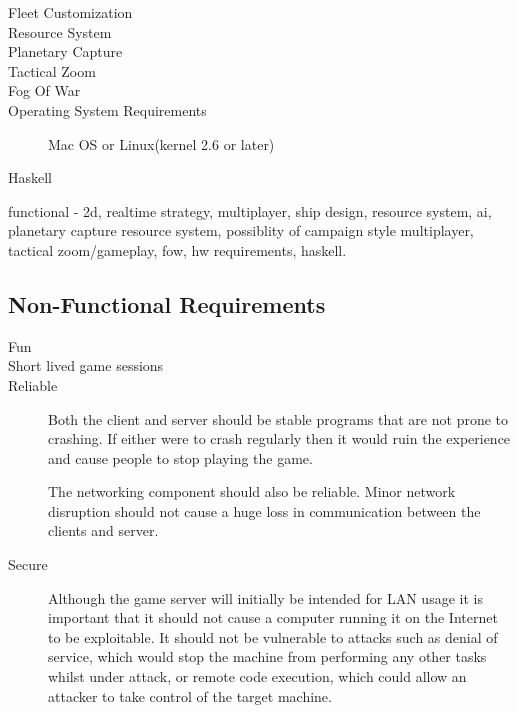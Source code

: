\begin{description}
\item[Fleet Customization]



\item[Resource System]

\item[Planetary Capture]

\item[Tactical Zoom]

\item[Fog Of War]

\item[Operating System Requirements]
Mac OS or Linux(kernel 2.6 or later) 

\item[Haskell]

\end{description}

functional - 2d, realtime strategy, multiplayer, ship design, resource system, ai, planetary capture resource system, possiblity of campaign style multiplayer, tactical zoom/gameplay, fow, hw requirements, haskell.


\subsection{Non-Functional Requirements}

\begin{description}

	\item[Fun]

	\item[Short lived game sessions]

	\item[Reliable]

		Both the client and server should be stable programs that are not prone to
		crashing. If either were to crash regularly then it would ruin the experience
		and cause people to stop playing the game.

		The networking component should also be reliable. Minor network disruption should
		not cause a huge loss in communication between the clients and server.

	\item[Secure]

		Although the game server will initially be intended for LAN usage it is
		important that it should not cause a computer running it on the Internet to be
		exploitable. It should not be vulnerable to attacks such as denial of service,
		which would stop the machine from performing any other tasks whilst under attack,
		or remote code execution, which could allow an attacker to take control of the
		target machine.

\end{description}

